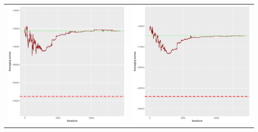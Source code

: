 \documentclass[]{scrartcl}
\begin{document}
\begin{table}[h!]
\begin{tabular}{cc}
\includegraphics[scale = 0.4]{./figs/win95pts/v5/25/avgBoundsEvolution-14252.pdf} & 
\includegraphics[scale = 0.4]{./figs/win95pts/v5/50/avgBoundsEvolution-14252.pdf} \\

\end{tabular}
\end{table}
\end{document}
